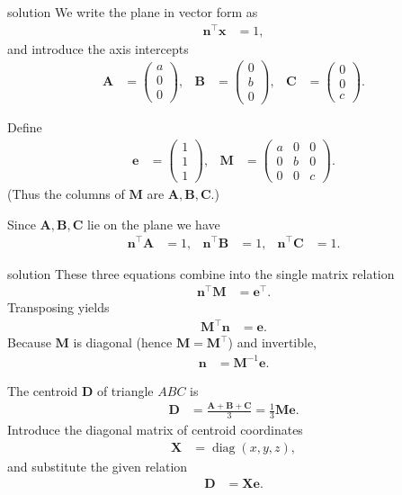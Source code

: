 \documentclass{beamer}
\numberwithin{equation}{section}
\theoremstyle{remark}
\newcommand{\myvec}[1]{\ensuremath{\begin{pmatrix}#1\end{pmatrix}}}
\let\vec\mathbf
\begin{document}
\begin{frame}{solution}
We write the plane in vector form as
\begin{align}
\vec{n}^{\top}\vec{x} &= 1,
\end{align}
and introduce the axis intercepts
\begin{align}
\vec{A} &= \myvec{a\\[4pt]0\\[4pt]0}, & 
\vec{B} &= \myvec{0\\[4pt]b\\[4pt]0}, &
\vec{C} &= \myvec{0\\[4pt]0\\[4pt]c}.
\end{align}

Define
\begin{align}
\vec{e} &= \myvec{1\\[4pt]1\\[4pt]1}, &
\mathbf{M} &= \myvec{a&0&0\\[4pt]0&b&0\\[4pt]0&0&c}.
\end{align}
(Thus the columns of $\mathbf{M}$ are $\vec{A},\vec{B},\vec{C}$.)

Since $\vec{A},\vec{B},\vec{C}$ lie on the plane we have
\begin{align}
\vec{n}^{\top}\vec{A} &= 1, & 
\vec{n}^{\top}\vec{B} &= 1, & 
\vec{n}^{\top}\vec{C} &= 1.
\end{align}
\end{frame}
\begin{frame}{solution}
These three equations combine into the single matrix relation
\begin{align}
\vec{n}^{\top}\mathbf{M} &= \vec{e}^{\top}.
\end{align}
Transposing yields
\begin{align}
\mathbf{M}^{\top}\vec{n} &= \vec{e}.
\end{align}
Because $\mathbf{M}$ is diagonal (hence $\mathbf{M}=\mathbf{M}^{\top}$) and invertible,
\begin{align}
\vec{n} &= \mathbf{M}^{-1}\vec{e}.
\end{align}

The centroid $\vec{D}$ of triangle $ABC$ is
\begin{align}
\vec{D} &= \frac{\vec{A}+\vec{B}+\vec{C}}{3}
= \tfrac{1}{3}\mathbf{M}\vec{e}.
\end{align}
Introduce the diagonal matrix of centroid coordinates
\begin{align}
\mathbf{X} &= \operatorname{diag}(x,y,z),
\end{align}
and substitute the given relation
\begin{align}
\vec{D} &= \mathbf{X}\vec{e}.
\end{align}
\end{frame}
\end{document}
